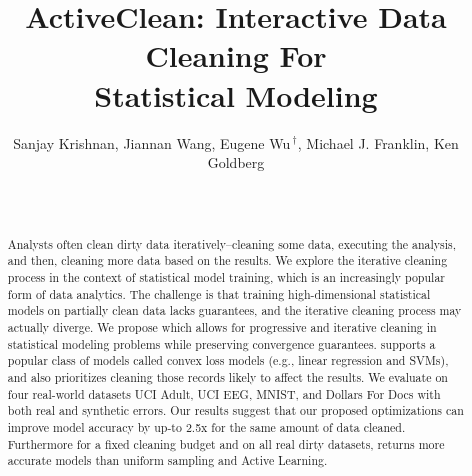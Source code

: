 \documentclass{sig-alternate}
\begin{document}
\newcommand{\reminder}[1]{{{\textcolor{magenta}{\{\{\bf #1\}\}}}\xspace}}
\newcommand{\specialcell}[2][c]{%
  \begin{tabular}[#1]{@{}c@{}}#2\end{tabular}}

\def\ojoin{\setbox0=\hbox{$\bowtie$}%
  \rule[-.02ex]{.25em}{.4pt}\llap{\rule[\ht0]{.25em}{.4pt}}}
\def\leftouterjoin{\mathbin{\ojoin\mkern-5.8mu\bowtie}}
\def\rightouterjoin{\mathbin{\bowtie\mkern-5.8mu\ojoin}}
\def\fullouterjoin{\mathbin{\ojoin\mkern-5.8mu\bowtie\mkern-5.8mu\ojoin}}


\pagestyle{plain}



\title{ActiveClean: Interactive Data Cleaning For \\ Statistical Modeling}

\author{\large Sanjay Krishnan, Jiannan Wang, Eugene Wu{$\,^\dag$}, Michael J. Franklin, Ken Goldberg \\
\vspace{.2em} \\
\vspace{.1em}\\
}



\maketitle

\begin{abstract}
Analysts often clean dirty data iteratively--cleaning some data, executing the analysis, and then, cleaning more data based on the results.
We explore the iterative cleaning process in the context of statistical model training, which is an increasingly popular form of data analytics.  
The challenge is that training high-dimensional statistical models on partially clean data lacks guarantees, and the iterative cleaning process may actually diverge.
We propose \sys which allows for progressive and iterative cleaning in statistical modeling problems while preserving convergence guarantees.
\sys supports a popular class of models called convex loss models (e.g., linear regression and SVMs), and also prioritizes cleaning those records likely to affect the results.
We evaluate \sys on four real-world datasets UCI Adult, UCI EEG, MNIST, and Dollars For Docs with both real and synthetic errors.
Our results suggest that our proposed optimizations can improve model accuracy by up-to 2.5x for the same amount of data cleaned.
Furthermore for a fixed cleaning budget and on all real dirty datasets, \sys returns more accurate models than uniform sampling and Active Learning. 
\end{abstract}
\end{document}
